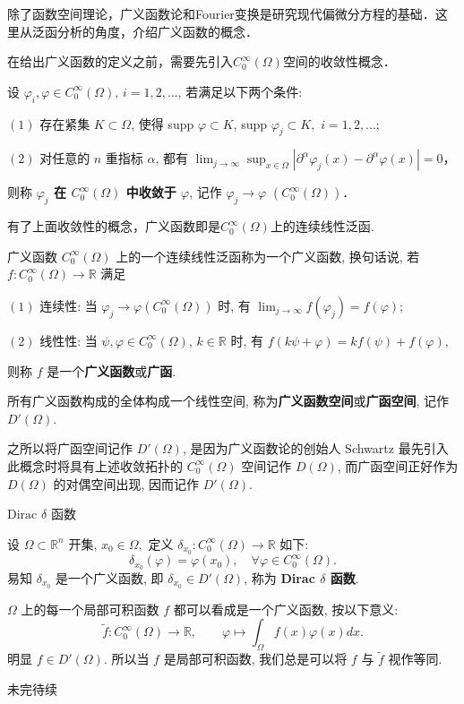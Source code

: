 
除了函数空间理论，广义函数论和Fourier变换是研究现代偏微分方程的基础．这里从泛函分析的角度，介绍广义函数的概念．

在给出广义函数的定义之前，需要先引入$C_0^\infty(\Omega)$空间的收敛性概念．

\begin{definition}{}
设 $\varphi_i,\varphi\in C_0^\infty(\Omega),\,i=1,2,...$,  若满足以下两个条件:

$(1)$ 存在紧集 $K\subset\Omega$, 使得 supp $\varphi\subset K$, supp $\varphi_{j}\subset K,$
$i=1,2,...;$ 

$(2)$ 对任意的 $n$ 重指标 $\alpha$, 都有 ${\displaystyle \lim_{j\rightarrow\infty}{\displaystyle \sup_{x\in\Omega}\left|\partial^{\alpha}\varphi_{j}(x)-\partial^{\alpha}\varphi(x)\right|=0}}$，


则称\textbf{ \textbf{$\varphi_{j}$ 在 $C_{0}^{\infty}(\Omega)$ 中收敛于 $\varphi$}}, 记作 
$\varphi_{j}\rightarrow\varphi$ $(C_{0}^{\infty}(\Omega))$．

\end{definition}

有了上面收敛性的概念，广义函数即是$C_0^\infty(\Omega)$上的连续线性泛函.

\begin{definition}{广义函数}
$C_{0}^{\infty}(\Omega)$ 上的一个连续线性泛函称为一个广义函数, 换句话说, 若 $f:C_{0}^{\infty}(\Omega)\rightarrow\mathbb{R}$
满足

$(1)$ 连续性: 当 $\varphi_{j}\rightarrow\varphi(C_{0}^{\infty}(\Omega))$
时, 有 ${\displaystyle \lim_{j\rightarrow\infty}f(\varphi_{j})=f(\varphi)}$; 

$(2)$ 线性性: 当 $\psi,\varphi\in C_{0}^{\infty}(\Omega)$, $k\in\mathbb{R}$
时, 有 $f(k\psi+\varphi)=kf(\psi)+f(\varphi),$

则称 $f$ 是一个\textbf{广义函数}或\textbf{广函}. 

所有广义函数构成的全体构成一个线性空间, 称为\textbf{广义函数空间}或\textbf{广函空间}, 记作 $D'(\Omega)$. 

\end{definition}

之所以将广函空间记作 $D'(\Omega)$, 是因为广义函数论的创始人 Schwartz 最先引入此概念时将具有上述收敛拓扑的
$C_{0}^{\infty}(\Omega)$ 空间记作 $D(\Omega)$, 而广函空间正好作为 $D(\Omega)$
的对偶空间出现, 因而记作 $D'(\Omega)$. 
\begin{example}{$\mathrm{Dirac}$ $\delta$ 函数
}

设 $\Omega\subset\mathbb{R}^{n}$ 开集, $x_{0}\in\Omega,$ 定义 $\delta_{x_{0}}:C_{0}^{\infty}(\Omega)\rightarrow\mathbb{R}$
如下: 
\[
\delta_{x_{0}}(\varphi)=\varphi(x_{0}),\quad\forall\varphi\in C_{0}^{\infty}(\Omega).
\]
易知 $\delta_{x_{0}}$ 是一个广义函数, 即 $\delta_{x_{0}}\in D'(\Omega)$, 称为
\textbf{Dirac $\delta$ 函数}. 
\end{example}

\begin{example}{}
$\Omega$ 上的每一个局部可积函数 $f$ 都可以看成是一个广义函数, 按以下意义: 
\[
\tilde{f}:C_{0}^{\infty}(\Omega)\rightarrow\mathbb{R},\quad\quad\varphi\mapsto{\displaystyle \int_{\Omega}f(x)\varphi(x)dx}.
\]
明显 $f\in D'(\Omega)$. 所以当 $f$ 是局部可积函数, 我们总是可以将 $f$ 与 $\tilde{f}$
视作等同. 
\end{example}

未完待续